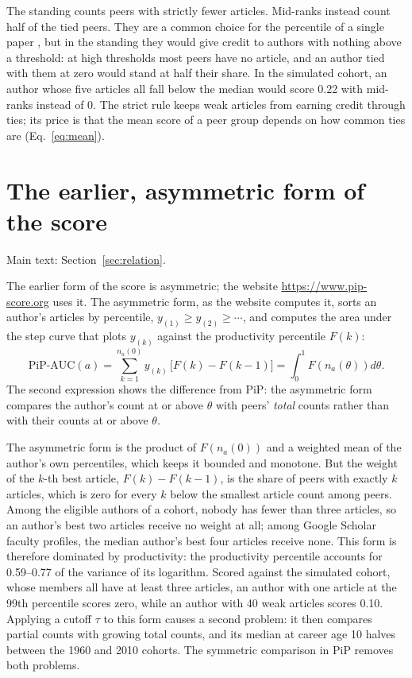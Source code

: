\documentclass[11pt]{article}
\begin{document}
The standing counts peers with strictly fewer articles. Mid-ranks instead count half of the tied
peers. They are a common choice for the percentile of a single paper \citep{bornmann2013use,waltman2013percentile},
but in the standing they would give credit to authors with nothing above a threshold: at high thresholds most peers
have no article, and an author tied with them at zero would stand at half their share. In the simulated cohort, an
author whose five articles all fall below the median would score 0.22 with mid-ranks instead of 0. The strict rule
keeps weak articles from earning credit through ties; its price is that the mean score of a peer group depends on how
common
ties are (Eq.~\ref{eq:mean}).

\section{The earlier, asymmetric form of the score}
\label{supp:asym}
\noindent Main text: Section~\ref{sec:relation}.\par\nopagebreak

The earlier form of the score \citep{ipeirotis2024pip} is asymmetric; the website \url{https://www.pip-score.org} uses
it. The asymmetric form, as the website computes it, sorts an author's articles by percentile, $y_{(1)} \ge y_{(2)} \ge
\cdots$, and computes the area under the step curve that plots $y_{(k)}$ against the productivity percentile $F(k)$:
\begin{equation}
\text{PiP-AUC}(a) = \sum_{k=1}^{n_a(0)} y_{(k)}\,\bigl[F(k) - F(k-1)\bigr] = \int_0^1 F\!\left(n_a(\theta)\right)
d\theta .
\end{equation}
The second expression shows the difference from PiP: the asymmetric form compares the author's count at or above
$\theta$ with peers' \emph{total} counts rather than with their counts at or above $\theta$.

The asymmetric form is the product of $F(n_a(0))$ and a weighted mean of the author's own percentiles, which keeps it
bounded and monotone. But the weight of the $k$-th best article, $F(k) - F(k-1)$, is the share of peers with exactly $k$
articles, which is zero for every $k$ below the smallest article count among peers. Among the eligible authors of a
cohort, nobody has fewer than three articles, so an author's best two articles receive no weight at all; among Google
Scholar faculty profiles, the median author's best four articles receive none. This form is therefore dominated by
productivity: the productivity percentile accounts for 0.59--0.77 of the variance of its logarithm. Scored against the
simulated cohort, whose members all have at least three articles, an author with one article at the 99th percentile
scores zero, while an author with 40 weak articles scores 0.10. Applying a cutoff $\tau$ to this form causes a second
problem: it then compares partial counts with growing total counts, and its median at career age 10 halves between the
1960 and 2010 cohorts. The symmetric comparison in PiP removes both problems.
\end{document}

